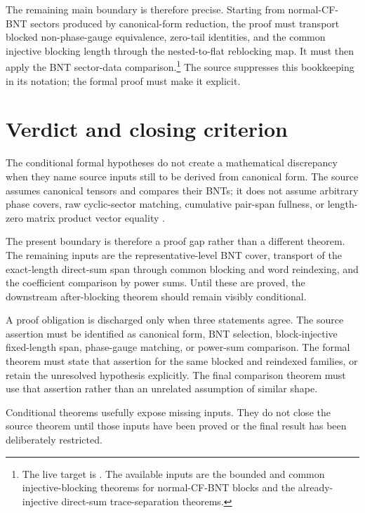 \documentclass{article}
\begin{document}
The remaining main boundary is therefore precise. Starting from normal-CF-BNT
sectors produced by canonical-form reduction, the proof must transport blocked
non-phase-gauge equivalence, zero-tail identities, and the common injective
blocking length through the nested-to-flat reblocking map. It must then apply
the BNT sector-data comparison.\footnote{The live target is
. The available inputs are
the bounded and common injective-blocking theorems for normal-CF-BNT blocks and
the already-injective direct-sum trace-separation theorems.}
The source suppresses this bookkeeping in its notation; the formal proof must
make it explicit.

\section{Verdict and closing criterion}

The conditional formal hypotheses do not create a mathematical discrepancy
when they name source inputs still to be derived from canonical form. The
source assumes canonical tensors and compares their BNTs; it does not assume
arbitrary phase covers, raw cyclic-sector matching, cumulative pair-span
fullness, or length-zero matrix product vector equality
\cite{Cirac2016MPDO_arXiv,Cirac2021Matrix}.

The present boundary is therefore a proof gap rather than a different theorem.
The remaining inputs are the representative-level BNT cover, transport of the
exact-length direct-sum span through common blocking and word reindexing, and
the coefficient comparison by power sums. Until these are proved, the
downstream after-blocking theorem should remain visibly conditional.

A proof obligation is discharged only when three statements agree. The source
assertion must be identified as canonical form, BNT selection,
block-injective fixed-length span, phase-gauge matching, or power-sum
comparison. The formal theorem must state that assertion for the same blocked
and reindexed families, or retain the unresolved hypothesis explicitly. The
final comparison theorem must use that assertion rather than an unrelated
assumption of similar shape.

Conditional theorems usefully expose missing inputs. They do not close the
source theorem until those inputs have been proved or the final result has been
deliberately restricted.



\end{document}

